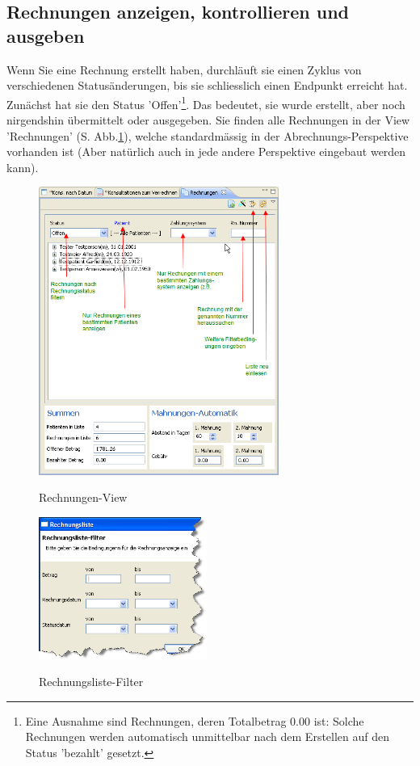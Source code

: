 \documentclass[a4paper]{scrartcl}
\begin{document}
\subsection{Rechnungen anzeigen, kontrollieren und ausgeben}
Wenn Sie eine Rechnung erstellt haben, durchläuft sie einen Zyklus von verschiedenen Statusänderungen, bis sie schliesslich einen Endpunkt erreicht hat. Zunächst hat sie den Status 'Offen'\footnote{Eine Ausnahme sind Rechnungen, deren Totalbetrag 0.00 ist: Solche Rechnungen werden automatisch unmittelbar nach dem Erstellen auf den Status 'bezahlt' gesetzt.}. Das bedeutet, sie wurde erstellt, aber noch nirgendshin übermittelt oder ausgegeben. Sie finden alle Rechnungen in der View 'Rechnungen' (S. Abb.\ref{fig:abr11}), welche standardmässig in der Abrechnungs-Perspektive vorhanden ist (Aber natürlich auch in jede andere Perspektive eingebaut werden kann).
\begin{figure}
  \center
  \includegraphics[width=0.7\textwidth]{abr11}\\
  \caption{Rechnungen-View}\label{fig:abr11}
\end{figure}
\begin{figure}
  \center
  \includegraphics[width=5.5cm]{abr12}\\
  \caption{Rechnungsliste-Filter}\label{fig:abr12}
\end{figure}
\end{document}
